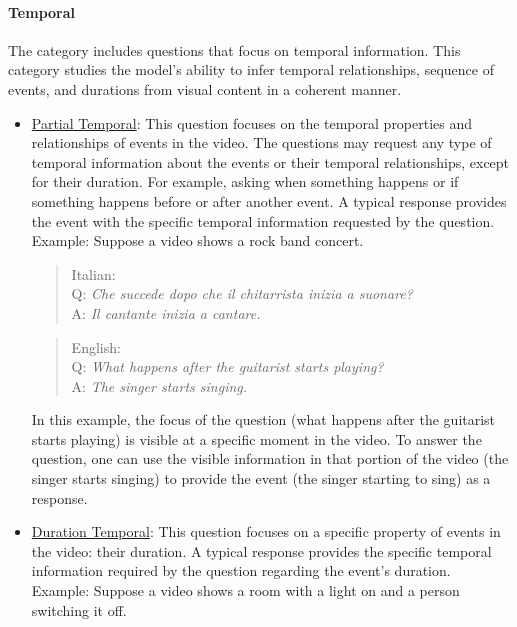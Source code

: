 \paragraph{{\textbf{Temporal}}}
The category includes questions that focus on temporal information. This category studies the model's ability to infer temporal relationships, sequence of events, and durations from visual content in a coherent manner.
\begin{itemize}
    \item \underline{Partial Temporal}: This question focuses on the temporal properties and relationships of events in the video. The questions may request any type of temporal information about the events or their temporal relationships, except for their duration. For example, asking when something happens or if something happens before or after another event. A typical response provides the event with the specific temporal information requested by the question.\\
    Example: Suppose a video shows a rock band concert.

    \begin{quote}
        Italian:\\
Q: \textit{Che succede dopo che il chitarrista inizia a suonare?}\\
A: \textit{Il cantante inizia a cantare.}\\
    \end{quote}

    
    \begin{quote}
        English:\\
Q: \textit{What happens after the guitarist starts playing?}\\
A: \textit{The singer starts singing.}\\
    \end{quote}
In this example, the focus of the question (what happens after the guitarist starts playing) is visible at a specific moment in the video. To answer the question, one can use the visible information in that portion of the video (the singer starts singing) to provide the event (the singer starting to sing) as a response.

    \item \underline{Duration Temporal}: This question focuses on a specific property of events in the video: their duration. A typical response provides the specific temporal information required by the question regarding the event’s duration.\\
    Example: Suppose a video shows a room with a light on and a person switching it off.


\end{itemize}

